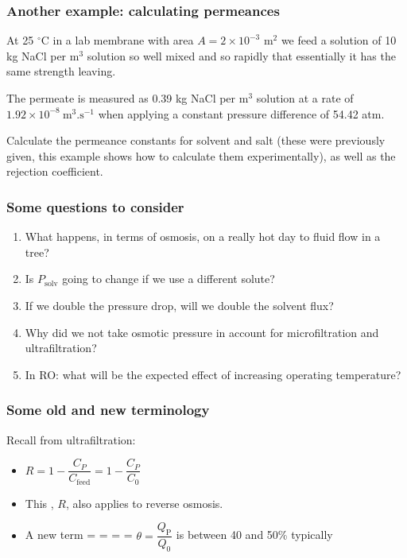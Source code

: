 \begin{frame}\frametitle{Another example: calculating permeances}
	At 25 $^\circ$C in a lab membrane with area $A = 2 \times 10^{-3}$ $\text{m}^{2}$ we feed a solution of 10 kg NaCl per m$^3$ solution so well mixed and so rapidly that essentially it has the same strength leaving.

	\vspace{12pt}
	The permeate is measured as 0.39 kg NaCl per $\text{m}^{3}$ solution at a rate of $1.92 \times 10^{-8}~\text{m}^3\text{.s}^{-1}$ when applying a constant pressure difference of 54.42 atm.

	\vspace{12pt}
	Calculate the permeance constants for solvent and salt (these were previously given, this example shows how to calculate them experimentally), as well as the rejection coefficient.
\end{frame}

\begin{frame}\frametitle{Some questions to consider}
	\begin{enumerate}
		\item	What happens, in terms of osmosis, on a really hot day to fluid flow in a tree?
		\item	Is $P_\text{solv}$ going to change if we use a different solute?
		\item	If we double the pressure drop, will we double the solvent flux?
		\item	Why did we not take osmotic pressure in account for microfiltration and ultrafiltration?
		\item	In RO: what will be the expected effect of increasing operating temperature?
	\end{enumerate}
\end{frame}

\begin{frame}\frametitle{Some old and new terminology}
	Recall from ultrafiltration:
	\begin{itemize}
		\item	$R = 1 - \dfrac{C_P}{C_\text{feed}} = 1 - \dfrac{C_P}{C_\text{0}}$ %

		\item	This {\color{purple}{rejection coefficient}}, $R$, also applies to reverse osmosis.

		\item	A new term = {\color{purple}{cut}} = {\color{purple}{conversion}} = {\color{purple}{recovery}} = $\theta = \dfrac{Q_\text{P}}{Q_\text{0}}$ is between 40 and 50\% typically
	\end{itemize}
\end{frame}



